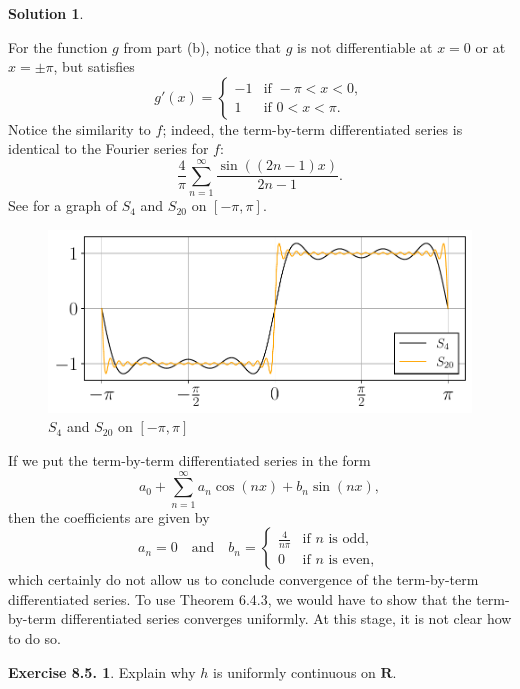 \documentclass[12pt]{article}
\theoremstyle{definition}
\theoremstyle{exercise}
\newtheorem{exercise}{Exercise 8.5.}
\theoremstyle{solution}
\newtheorem*{solution}{Solution}
\newcommand{\quand}{\quad \text{and} \quad}
\newcommand{\R}{\mathbf{R}}
\begin{document}
\begin{solution}
\begin{enumerate}
        For the function \( g \) from part (b), notice that \( g \) is not differentiable at \( x = 0 \) or at \( x = \pm \pi \), but satisfies
        \[
            g'(x) = \begin{cases}
                -1 & \text{if } -\pi < x < 0, \\
                1 & \text{if } 0 < x < \pi.
            \end{cases}
        \]
        Notice the similarity to \( f \); indeed, the term-by-term differentiated series is identical to the Fourier series for \( f \):
        \[
            \frac{4}{\pi} \sum_{n=1}^{\infty} \frac{\sin((2n - 1)x)}{2n - 1}.
        \]
        See  for a graph of \( S_4 \) and \( S_{20} \) on \( [-\pi, \pi] \).
        \begin{figure}[H]
            \centering
            \includegraphics{UA_Section_8_5_Figure_3.pdf}
            \caption{\( S_4 \) and \( S_{20} \) on \( [-\pi, \pi] \)}
            \label{fig:3}
        \end{figure}
        If we put the term-by-term differentiated series in the form
        \[
            a_0 + \sum_{n=1}^{\infty} a_n \cos(nx) + b_n \sin(nx),
        \]
        then the coefficients are given by
        \[
            a_n = 0 \quand b_n = \begin{cases}
                \frac{4}{n \pi} & \text{if } n \text{ is odd}, \\
                0 & \text{if } n \text{ is even},
            \end{cases}
        \]
        which certainly do not allow us to conclude convergence of the term-by-term differentiated series. To use Theorem 6.4.3, we would have to show that the term-by-term differentiated series converges uniformly. At this stage, it is not clear how to do so.
    \end{enumerate}
\end{solution}

\begin{exercise}
\label{ex:5}
    Explain why \( h \) is uniformly continuous on \( \R \).
\end{exercise}
\end{document}
